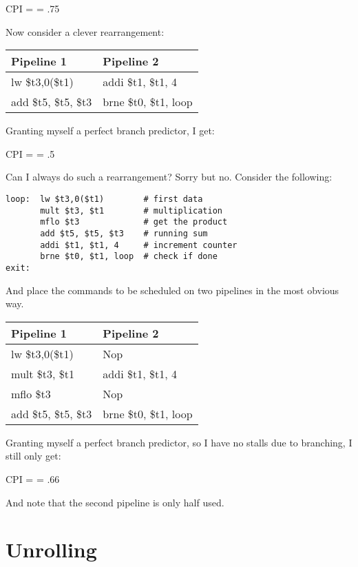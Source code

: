 \beqn
CPI = = .75
\eeqn

Now consider a clever rearrangement:

\vspace{3pt}
\begin{tabular}{l|l}
  Pipeline 1 & Pipeline 2 \\
  \hline
  lw \$t3,0(\$t1) & addi \$t1, \$t1, 4 \\
  add \$t5, \$t5, \$t3 & brne \$t0, \$t1, loop \\
\end{tabular}
\vspace{3pt}

Granting myself a perfect branch predictor, I get:

\beqn
CPI = = .5
\eeqn

Can I always do such a rearrangement?  Sorry but no.  Consider the following:


\begin{verbatim}
loop:  lw $t3,0($t1)        # first data
       mult $t3, $t1        # multiplication
       mflo $t3             # get the product
       add $t5, $t5, $t3    # running sum
       addi $t1, $t1, 4     # increment counter
       brne $t0, $t1, loop  # check if done
exit:
\end{verbatim}

And place the commands to be scheduled on two pipelines in the most obvious way.

\vspace{3pt}
\begin{tabular}{l|l}
  Pipeline 1 & Pipeline 2 \\
  \hline
  lw \$t3,0(\$t1) & Nop \\
  mult \$t3, \$t1   & addi \$t1, \$t1, 4 \\
  mflo \$t3        & Nop \\
  add \$t5, \$t5, \$t3 & brne \$t0, \$t1, loop \\
\end{tabular}
\vspace{3pt}

Granting myself a perfect branch predictor, so I have no stalls due to branching, I still only get:

\beqn
CPI = = .66
\eeqn

And note that the second pipeline is only half used.

\section{Unrolling}

